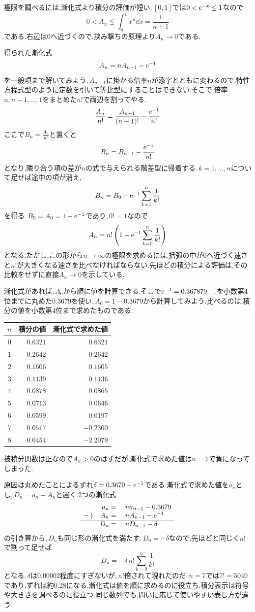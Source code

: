 極限を調べるには,漸化式より積分の評価が短い.\,$[0,1]$では$0<\mathrm{e}^{-x}\le1$なので
\[
 0<A_n\le\int_0^1x^n\dd x=\frac1{n+1}
\]
である.右辺は$0$へ近づくので,挟み撃ちの原理より$A_n\to0$である.

得られた漸化式
\[
 A_n=nA_{n-1}-\mathrm{e}^{-1}
\]
を一般項まで解いてみよう.\,$A_{n-1}$に掛かる倍率$n$が添字とともに変わるので,特性方程式型のように定数を引いて等比型にすることはできない.そこで,倍率$n,n-1,\ldots,1$をまとめた$n!$で両辺を割ってやる.
\[
 \frac{A_n}{n!}=\frac{A_{n-1}}{(n-1)!}-\frac{\mathrm{e}^{-1}}{n!}
\]
ここで$B_n=\frac{A_n}{n!}$と置くと
\[
 B_n=B_{n-1}-\frac{\mathrm{e}^{-1}}{n!}
\]
となり,隣り合う項の差が$n$の式で与えられる階差型に帰着する.\,$k=1,\ldots,n$について足せば途中の項が消え,
\[
 B_n=B_0-\mathrm{e}^{-1}\sum_{k=1}^{n}\frac1{k!}
\]
を得る.\,$B_0=A_0=1-\mathrm{e}^{-1}$であり,\,$0!=1$なので
\[
 A_n=n!\left(1-\mathrm{e}^{-1}\sum_{k=0}^{n}\frac1{k!}\right)
\]
となる.ただし,この形から$n\to\infty$の極限を求めるには,括弧の中が$0$へ近づく速さと$n!$が大きくなる速さを比べなければならない.先ほどの積分による評価は,その比較をせずに直接$A_n\to0$を示している.

漸化式があれば,\,$A_0$から順に値を計算できる.そこで$\mathrm{e}^{-1}=0.367879\ldots$を小数第4位までに丸めた$0.3679$を使い,\,$A_0=1-0.3679$から計算してみよう.比べるのは,積分の値を小数第4位まで求めたものである.
\begin{center}
\begin{tabular}{crr}
\toprule
$n$ & 積分の値 & 漸化式で求めた値\\
\midrule
$0$ & $0.6321$ & $0.6321$\\
$1$ & $0.2642$ & $0.2642$\\
$2$ & $0.1606$ & $0.1605$\\
$3$ & $0.1139$ & $0.1136$\\
$4$ & $0.0878$ & $0.0865$\\
$5$ & $0.0713$ & $0.0646$\\
$6$ & $0.0599$ & $0.0197$\\
$7$ & $0.0517$ & $-0.2300$\\
$8$ & $0.0454$ & $-2.2079$\\
\bottomrule
\end{tabular}
\end{center}
被積分関数は正なので$A_n>0$のはずだが,漸化式で求めた値は$n=7$で負になってしまった.

原因は丸めたことによるずれ$\delta=0.3679-\mathrm{e}^{-1}$である.漸化式で求めた値を$a_n$とし,\,$D_n=a_n-A_n$と置く.2つの漸化式
\[
 \begin{array}{rrl}
 &a_n={}&na_{n-1}-0.3679\\
 -\,)&A_n={}&nA_{n-1}-\mathrm{e}^{-1}\\ \hline
 &D_n={}&nD_{n-1}-\delta
 \end{array}
\]
の引き算から,\,$D_n$も同じ形の漸化式を満たす.\,$D_0=-\delta$なので,先ほどと同じく$n!$で割って足せば
\[
 D_n=-\delta\,n!\sum_{k=0}^{n}\frac1{k!}
\]
となる.\,$\delta$は$0.00002$程度にすぎないが,\,$n!$倍されて現れたのだ.\,$n=7$では$7!=5040$であり,ずれは約$0.28$になる.漸化式は値を順に求めるのに役立ち,積分表示は符号や大きさを調べるのに役立つ.同じ数列でも,問いに応じて使いやすい表し方が違う.

